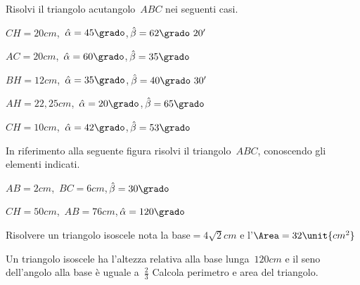 
\begin{esercizio}
\label{ese:G.22}
Risolvi il triangolo acutangolo~$ABC$ nei seguenti casi.
\begin{multicols}{2}
\begin{enumeratea}
\item ${CH}=20\unit{cm}$,\, $\hat{\alpha} =45\grado$,\,$\hat{\beta} 
=62\grado~20'$
\item ${AC}=20\unit{cm}$,\, $\hat{\alpha} =60\grado$,\,$\hat{\beta} =35\grado$
\item ${BH}=12\unit{cm}$,\, $\hat{\alpha} =35\grado$,\,$\hat{\beta} 
=40\grado~30'$
\item ${AH}=22,25\unit{cm}$,\, $\hat{\alpha} =20\grado$,\,$\hat{\beta} 
=65\grado$
\item ${CH}=10\unit{cm}$,\, $\hat{\alpha} =42\grado$,\,$\hat{\beta} =53\grado$
\end{enumeratea}
\end{multicols}
\end{esercizio}

\begin{esercizio}
\label{ese:G.23}
In riferimento alla seguente figura risolvi il triangolo~$ABC$, conoscendo gli 
elementi indicati.
\begin{center}
\begin{inaccessibleblock}
 
\end{inaccessibleblock}
\end{center}
\begin{multicols}{2}
 \begin{enumeratea}
\item ${AB}=2\unit{cm}$,\, ${BC}=6\unit{cm}$,\,$\hat{\beta} =30\grado$
\item ${CH}=50\unit{cm}$,\, ${AB}=76\unit{cm}$,\,$\hat{\alpha} =120\grado$
\end{enumeratea}
\end{multicols}
\end{esercizio}

\begin{multicols}{2}
\begin{esercizio}
\label{ese:G.24}
Risolvere un triangolo isoscele nota la base$=4\sqrt{2}\unit{cm}$ e 
l'$\Area=32\unit{cm^2}$
\end{esercizio}

\begin{esercizio}
\label{ese:G.25}
Un triangolo isoscele ha l'altezza relativa alla base lunga~$120\unit{cm}$ e il 
seno dell'angolo alla base è uguale a~$\frac{2}{3}$
Calcola perimetro e area del triangolo.
\end{esercizio}
\end{multicols}

